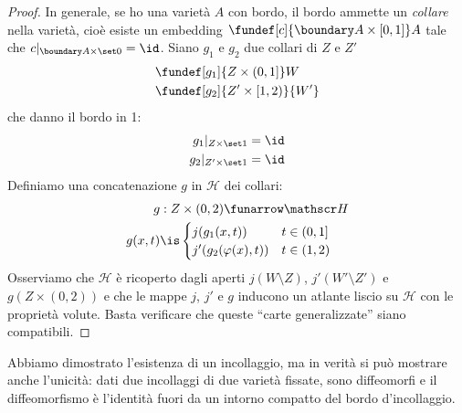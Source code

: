 \begin{proof}
	In generale, se ho una varietà $A$ con bordo, il bordo ammette un \emph{collare} nella varietà, cioè esiste un embedding $\fundef[c]{\boundary A\times[0,1]}A$ tale che $c|_{\boundary A\times\set0}=\id$.
	Siano $g_1$ e $g_2$ due collari di $Z$ e $Z'$
	\begin{align*}
		&\fundef[g_1]{Z\times(0,1]}W\\
		&\fundef[g_2]{Z'\times[1,2)}{W'}
	\end{align*}
	che danno il bordo in 1:
	\begin{align*}
		g_1|_{Z\times\set1}&=\id\\
		g_2|_{Z'\times\set1}&=\id
	\end{align*}
	Definiamo una concatenazione $g$ in $\mathscr H$ dei collari:
	\begin{align*}
		g&:Z\times(0,2)\funarrow\mathscr H \\
		g(x,t)&\is\begin{cases}
			j(g_1(x,t)) & t\in(0,1] \\
			j'(g_2(\varphi(x),t)) & t\in(1,2)
		\end{cases}
	\end{align*}
	Osserviamo che $\mathscr H$ è ricoperto dagli aperti $j(W\setminus Z)$, $j'(W'\setminus Z')$ e $g(Z\times(0,2))$ e che le mappe $j$, $j'$ e $g$ inducono un atlante liscio su $\mathscr H$ con le proprietà volute. Basta verificare che queste ``carte generalizzate'' siano compatibili.
\end{proof}

\begin{oss}
	Abbiamo dimostrato l'esistenza di un incollaggio, ma in verità si può mostrare anche l'unicità: dati due incollaggi di due varietà fissate, sono diffeomorfi e il diffeomorfismo è l'identità fuori da un intorno compatto del bordo d'incollaggio.
\end{oss}

